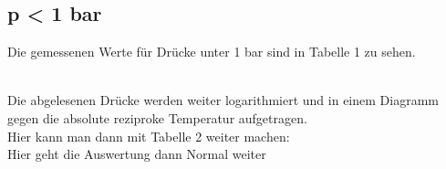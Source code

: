 \subsection{p < 1 bar}
Die gemessenen Werte für Drücke unter 1 bar sind in Tabelle 1 zu sehen.

\\
Die abgelesenen Drücke werden weiter logarithmiert und in einem Diagramm gegen
die absolute reziproke Temperatur aufgetragen. \\
\newpage
Hier kann man dann mit Tabelle 2 weiter machen:
 \\
Hier geht die Auswertung dann Normal weiter
